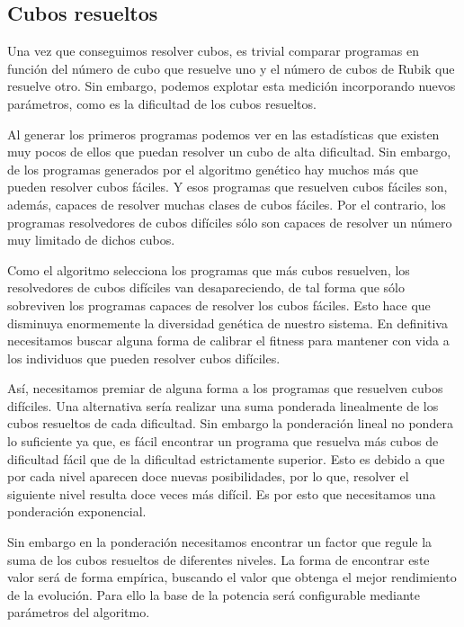 \subsection{Cubos resueltos}\label{subsec:cubosresueltos}

Una vez que conseguimos resolver cubos, es trivial comparar programas en función
del número de cubo que resuelve uno y el número de cubos de Rubik que resuelve
otro. Sin embargo, podemos explotar esta medición incorporando nuevos parámetros,
como es la dificultad de los cubos resueltos.

Al generar los primeros programas podemos ver en las estadísticas que existen muy
pocos de ellos que puedan resolver un cubo de alta dificultad. Sin embargo, de
los programas generados por el algoritmo genético hay muchos más que pueden
resolver cubos fáciles. Y esos programas que resuelven cubos fáciles son, además,
capaces de resolver muchas clases de cubos fáciles. Por el contrario, los
programas resolvedores de cubos difíciles sólo son capaces de resolver un número
muy limitado de dichos cubos.

Como el algoritmo selecciona los programas que más cubos resuelven, los
resolvedores de cubos difíciles van desapareciendo, de tal forma que sólo
sobreviven los programas capaces de resolver los cubos fáciles. Esto hace que
disminuya enormemente la diversidad genética de nuestro sistema. En definitiva
necesitamos buscar alguna forma de calibrar el fitness para mantener con vida a
los individuos que pueden resolver cubos difíciles.

Así, necesitamos premiar de alguna forma a los programas que resuelven cubos
difíciles. Una alternativa sería realizar una suma ponderada linealmente de los
cubos resueltos de cada dificultad. Sin embargo la ponderación lineal no pondera
lo suficiente ya que, es fácil encontrar un programa que resuelva más cubos de
dificultad fácil que de la dificultad estrictamente superior. Esto es debido a
que por cada nivel aparecen doce nuevas posibilidades, por lo que, resolver el
siguiente nivel resulta doce veces más difícil. Es por esto que necesitamos una
ponderación exponencial.

Sin embargo en la ponderación necesitamos encontrar un factor que regule la suma
de los cubos resueltos de diferentes niveles. La forma de encontrar este valor
será de forma empírica, buscando el valor que obtenga el mejor rendimiento de la
evolución. Para ello la base de la potencia será configurable mediante parámetros
del algoritmo.

